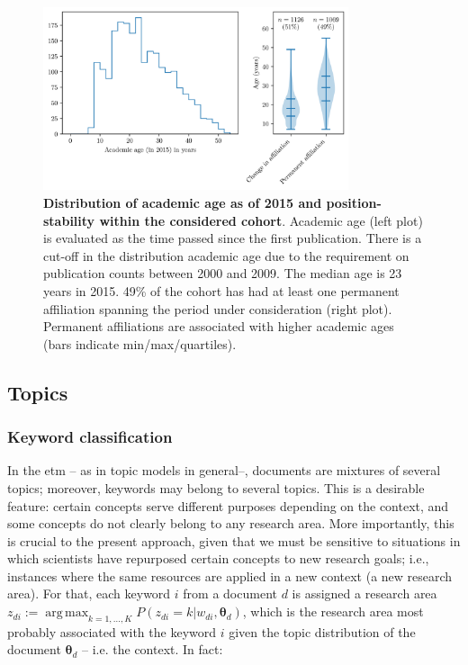 \documentclass{article}
\DeclareMathOperator*{\argmax}{arg\,max}
\begin{document}
\begin{figure}[H]
    \centering
    \includegraphics[width=0.8\textwidth]{plots/sample_characteristics.png}
    \caption{\textbf{Distribution of academic age as of 2015 and position-stability within the considered cohort}.  Academic age (left plot) is evaluated as the time passed since the first publication. There is a cut-off in the distribution academic age due to the requirement on publication counts between 2000 and 2009. The median age is 23 years in 2015. 49\% of the cohort has had at least one permanent affiliation spanning the period under consideration (right plot). Permanent affiliations are associated with higher academic ages (bars indicate min/max/quartiles). }
    \label{fig:sample_characteristics}
\end{figure}

\subsection{\label{appendix:topics}Topics}

\subsubsection{\label{appendix:keywords}Keyword classification}

In the \gls{etm} -- as in topic models in general--, documents are mixtures of several topics; moreover, keywords may belong to several topics. This is a desirable feature: certain concepts serve different purposes depending on the context, and some concepts do not clearly belong to any research area. More importantly, this is crucial to the present approach, given that we must be sensitive to situations in which scientists have repurposed certain concepts to new research goals; i.e., instances where the same resources are applied in a new context (a new research area).
For that, each keyword $i$ from a document $d$ is assigned a research area $z_{di} := \argmax_{k=1,\dots,K} P(z_{di}=k|w_{di},\bm{\theta}_{d})$, which is the research area most probably associated with the keyword $i$ given the topic distribution of the document $\bm{\theta}_d$ -- i.e. the context. In fact:
\end{document}
